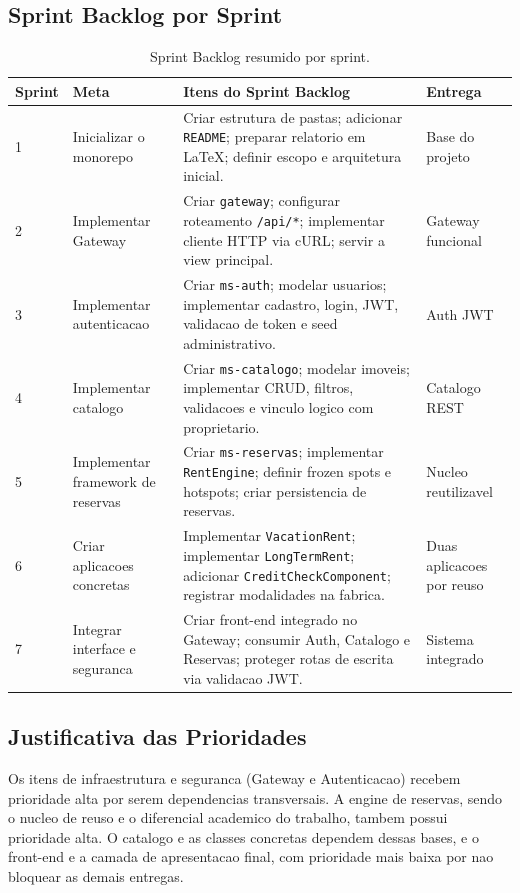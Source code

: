 \documentclass[12pt,a4paper]{article}
\begin{document}
\subsection{Sprint Backlog por Sprint}
\begin{table}[htbp]
    \centering
    \small
    \begin{tabularx}{\textwidth}{C{1.2cm} p{3cm} Y p{2.1cm}}
    \toprule
    \textbf{Sprint} & \textbf{Meta} & \textbf{Itens do Sprint Backlog} & \textbf{Entrega} \\
     & Inicializar o monorepo & Criar estrutura de pastas; adicionar \texttt{README}; preparar relatorio em LaTeX; definir escopo e arquitetura inicial. & Base do projeto \\
    2 & Implementar Gateway & Criar \texttt{gateway}; configurar roteamento \texttt{/api/*}; implementar cliente HTTP via cURL; servir a view principal. & Gateway funcional \\
    3 & Implementar autenticacao & Criar \texttt{ms-auth}; modelar usuarios; implementar cadastro, login, JWT, validacao de token e seed administrativo. & Auth JWT \\
    4 & Implementar catalogo & Criar \texttt{ms-catalogo}; modelar imoveis; implementar CRUD, filtros, validacoes e vinculo logico com proprietario. & Catalogo REST \\
    5 & Implementar framework de reservas & Criar \texttt{ms-reservas}; implementar \texttt{RentEngine}; definir frozen spots e hotspots; criar persistencia de reservas. & Nucleo reutilizavel \\
    6 & Criar aplicacoes concretas & Implementar \texttt{VacationRent}; implementar \texttt{LongTermRent}; adicionar \texttt{CreditCheckComponent}; registrar modalidades na fabrica. & Duas aplicacoes por reuso \\
    7 & Integrar interface e seguranca & Criar front-end integrado no Gateway; consumir Auth, Catalogo e Reservas; proteger rotas de escrita via validacao JWT. & Sistema integrado \\
    \bottomrule
    \end{tabularx}
    \caption{Sprint Backlog resumido por sprint.}
    \label{tab:sprint_backlog}
\end{table}

\subsection{Justificativa das Prioridades}
Os itens de infraestrutura e seguranca (Gateway e Autenticacao) recebem prioridade
alta por serem dependencias transversais. A engine de reservas, sendo o nucleo de
reuso e o diferencial academico do trabalho, tambem possui prioridade alta. O catalogo
e as classes concretas dependem dessas bases, e o front-end e a camada de apresentacao
final, com prioridade mais baixa por nao bloquear as demais entregas.
\end{document}
